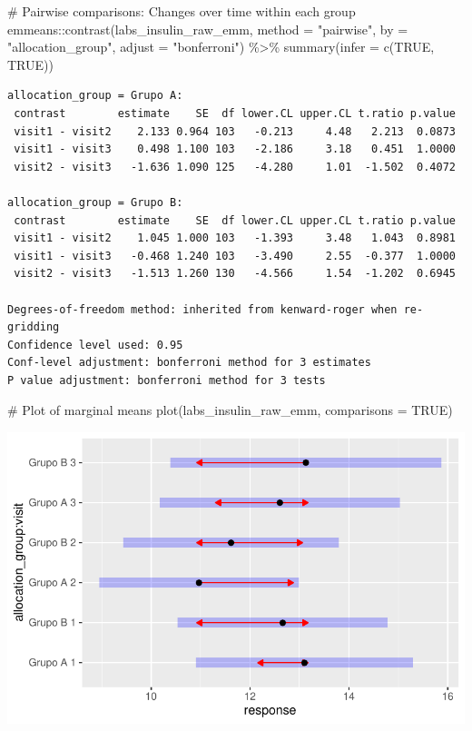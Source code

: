 \documentclass[
  12pt,
]{article}
\newenvironment{Shaded}{\begin{snugshade}}{\end{snugshade}}
\newcommand{\AttributeTok}[1]{\textcolor[rgb]{0.40,0.45,0.13}{#1}}
\newcommand{\CommentTok}[1]{\textcolor[rgb]{0.37,0.37,0.37}{#1}}
\newcommand{\ConstantTok}[1]{\textcolor[rgb]{0.56,0.35,0.01}{#1}}
\newcommand{\FunctionTok}[1]{\textcolor[rgb]{0.28,0.35,0.67}{#1}}
\newcommand{\NormalTok}[1]{\textcolor[rgb]{0.00,0.23,0.31}{#1}}
\newcommand{\SpecialCharTok}[1]{\textcolor[rgb]{0.37,0.37,0.37}{#1}}
\newcommand{\StringTok}[1]{\textcolor[rgb]{0.13,0.47,0.30}{#1}}
\begin{document}
\begin{Shaded}
\begin{Highlighting}[]
\CommentTok{\# Pairwise comparisons: Changes over time within each group}
\NormalTok{emmeans}\SpecialCharTok{::}\FunctionTok{contrast}\NormalTok{(labs\_insulin\_raw\_emm,}
\AttributeTok{method =} \StringTok{"pairwise"}\NormalTok{, }\AttributeTok{by =} \StringTok{"allocation\_group"}\NormalTok{,}
\AttributeTok{adjust =} \StringTok{"bonferroni"}\NormalTok{) }\SpecialCharTok{\%\textgreater{}\%} \FunctionTok{summary}\NormalTok{(}\AttributeTok{infer =} \FunctionTok{c}\NormalTok{(}\ConstantTok{TRUE}\NormalTok{, }\ConstantTok{TRUE}\NormalTok{))}
\end{Highlighting}
\end{Shaded}

\begin{verbatim}
allocation_group = Grupo A:
 contrast        estimate    SE  df lower.CL upper.CL t.ratio p.value
 visit1 - visit2    2.133 0.964 103   -0.213     4.48   2.213  0.0873
 visit1 - visit3    0.498 1.100 103   -2.186     3.18   0.451  1.0000
 visit2 - visit3   -1.636 1.090 125   -4.280     1.01  -1.502  0.4072

allocation_group = Grupo B:
 contrast        estimate    SE  df lower.CL upper.CL t.ratio p.value
 visit1 - visit2    1.045 1.000 103   -1.393     3.48   1.043  0.8981
 visit1 - visit3   -0.468 1.240 103   -3.490     2.55  -0.377  1.0000
 visit2 - visit3   -1.513 1.260 130   -4.566     1.54  -1.202  0.6945

Degrees-of-freedom method: inherited from kenward-roger when re-gridding 
Confidence level used: 0.95 
Conf-level adjustment: bonferroni method for 3 estimates 
P value adjustment: bonferroni method for 3 tests 
\end{verbatim}

\begin{Shaded}
\begin{Highlighting}[]
\CommentTok{\# Plot of marginal means}
\FunctionTok{plot}\NormalTok{(labs\_insulin\_raw\_emm, }\AttributeTok{comparisons =} \ConstantTok{TRUE}\NormalTok{)}
\end{Highlighting}
\end{Shaded}

\includegraphics{Outcomes_files/figure-pdf/labs_insulin_raw_emm-1.pdf}
\end{document}
